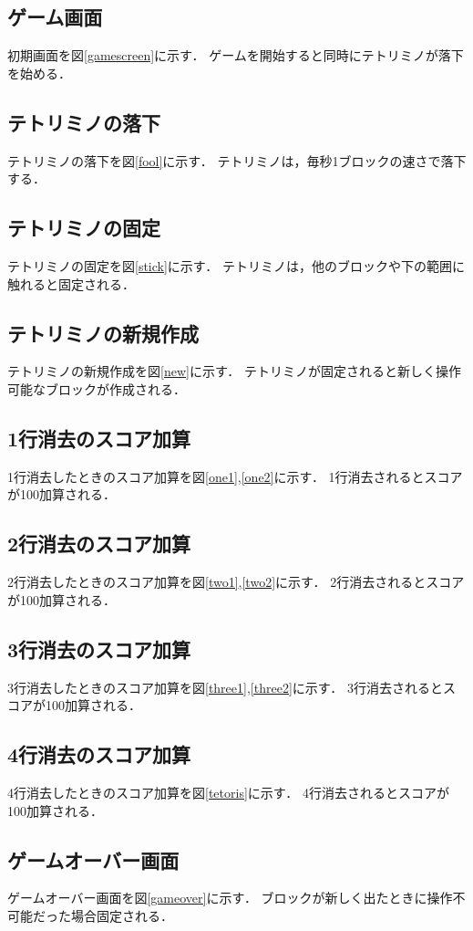\subsection{ゲーム画面}
初期画面を図\ref{gamescreen}に示す．
ゲームを開始すると同時にテトリミノが落下を始める．
\subsection{テトリミノの落下}
テトリミノの落下を図\ref{fool}に示す．
テトリミノは，毎秒1ブロックの速さで落下する．
\subsection{テトリミノの固定}
テトリミノの固定を図\ref{stick}に示す．
テトリミノは，他のブロックや下の範囲に触れると固定される．
\subsection{テトリミノの新規作成}
テトリミノの新規作成を図\ref{new}に示す．
テトリミノが固定されると新しく操作可能なブロックが作成される．
\subsection{1行消去のスコア加算}
1行消去したときのスコア加算を図\ref{one1},\ref{one2}に示す．
1行消去されるとスコアが100加算される．
\subsection{2行消去のスコア加算}
2行消去したときのスコア加算を図\ref{two1},\ref{two2}に示す．
2行消去されるとスコアが100加算される．
\subsection{3行消去のスコア加算}
3行消去したときのスコア加算を図\ref{three1},\ref{three2}に示す．
3行消去されるとスコアが100加算される．
\subsection{4行消去のスコア加算}
4行消去したときのスコア加算を図\ref{tetoris}に示す．
4行消去されるとスコアが100加算される．
\subsection{ゲームオーバー画面}
ゲームオーバー画面を図\ref{gameover}に示す．
ブロックが新しく出たときに操作不可能だった場合固定される．

